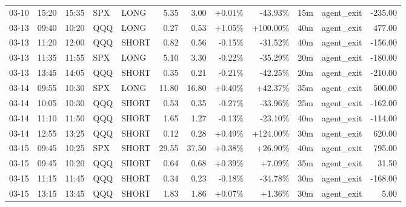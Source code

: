 \documentclass[11pt,a4paper,twoside]{article}
\begin{document}
\begin{center}
\begin{longtable}{>{\color{txtmain}}l l l l l r r r r r >{\color{txtmain}}l r}
03-10 & 15:20 & 15:35 & SPX & LONG & 5.35 & 3.00 & \textcolor{wingreen}{+0.01\%} & \textcolor{lossred}{-43.93\%} & 15m & agent\_exit & \textcolor{lossred}{-235.00} \\
03-13 & 09:40 & 10:20 & QQQ & LONG & 0.27 & 0.53 & \textcolor{wingreen}{+1.05\%} & \textcolor{wingreen}{+100.00\%} & 40m & agent\_exit & \textcolor{wingreen}{477.00} \\
03-13 & 11:20 & 12:00 & QQQ & SHORT & 0.82 & 0.56 & \textcolor{lossred}{-0.15\%} & \textcolor{lossred}{-31.52\%} & 40m & agent\_exit & \textcolor{lossred}{-156.00} \\
03-13 & 11:35 & 11:55 & SPX & LONG & 5.10 & 3.30 & \textcolor{lossred}{-0.22\%} & \textcolor{lossred}{-35.29\%} & 20m & agent\_exit & \textcolor{lossred}{-180.00} \\
03-13 & 13:45 & 14:05 & QQQ & SHORT & 0.35 & 0.21 & \textcolor{lossred}{-0.21\%} & \textcolor{lossred}{-42.25\%} & 20m & agent\_exit & \textcolor{lossred}{-210.00} \\
03-14 & 09:55 & 10:30 & SPX & LONG & 11.80 & 16.80 & \textcolor{wingreen}{+0.40\%} & \textcolor{wingreen}{+42.37\%} & 35m & agent\_exit & \textcolor{wingreen}{500.00} \\
03-14 & 10:05 & 10:30 & QQQ & SHORT & 0.53 & 0.35 & \textcolor{lossred}{-0.27\%} & \textcolor{lossred}{-33.96\%} & 25m & agent\_exit & \textcolor{lossred}{-162.00} \\
03-14 & 11:10 & 11:50 & QQQ & SHORT & 1.65 & 1.27 & \textcolor{lossred}{-0.13\%} & \textcolor{lossred}{-23.10\%} & 40m & agent\_exit & \textcolor{lossred}{-114.00} \\
03-14 & 12:55 & 13:25 & QQQ & SHORT & 0.12 & 0.28 & \textcolor{wingreen}{+0.49\%} & \textcolor{wingreen}{+124.00\%} & 30m & agent\_exit & \textcolor{wingreen}{620.00} \\
03-15 & 09:45 & 10:25 & SPX & SHORT & 29.55 & 37.50 & \textcolor{wingreen}{+0.38\%} & \textcolor{wingreen}{+26.90\%} & 40m & agent\_exit & \textcolor{wingreen}{795.00} \\
03-15 & 09:45 & 10:20 & QQQ & SHORT & 0.64 & 0.68 & \textcolor{wingreen}{+0.39\%} & \textcolor{wingreen}{+7.09\%} & 35m & agent\_exit & \textcolor{wingreen}{31.50} \\
03-15 & 11:15 & 11:45 & QQQ & SHORT & 0.34 & 0.23 & \textcolor{lossred}{-0.18\%} & \textcolor{lossred}{-34.78\%} & 30m & agent\_exit & \textcolor{lossred}{-168.00} \\
03-15 & 13:15 & 13:45 & QQQ & SHORT & 1.83 & 1.86 & \textcolor{wingreen}{+0.07\%} & \textcolor{wingreen}{+1.36\%} & 30m & agent\_exit & \textcolor{wingreen}{5.00} \\

\end{longtable}
\end{center}
\end{document}
